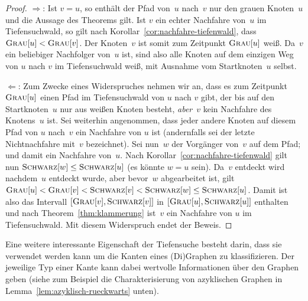 \begin{proof}
\glqq $\Longrightarrow$\grqq: Ist $v=u$, so enthält der Pfad von~$u$ nach~$v$ nur den grauen Knoten~$u$ und die Aussage des Theorems gilt.
Ist $v$ ein echter Nachfahre von~$u$ im Tiefensuchwald, so gilt nach Korollar~\ref{cor:nachfahre-tiefenwald}, dass $\mathop{\text{\textsc{Grau}}}[u] < \mathop{\text{\textsc{Grau}}}[v]$.
Der Knoten~$v$ ist somit zum Zeitpunkt $\mathop{\text{\textsc{Grau}}}[u]$ weiß.
Da~$v$ ein beliebiger Nachfolger von~$u$ ist, sind also alle Knoten auf dem einzigen Weg von $u$ nach $v$ im Tiefensuchwald weiß, mit Ausnahme vom Startknoten~$u$ selbst.

\glqq $\Longleftarrow$\grqq: Zum Zwecke eines Widerspruches nehmen wir an, dass es zum Zeitpunkt $\mathop{\text{\textsc{Grau}}}[u]$ einen Pfad im Tiefensuchwald von $u$ nach $v$ gibt, der bis auf den Startknoten~$u$ nur aus weißen Knoten besteht, \emph{aber}~$v$ kein Nachfahre des Knotens~$u$ ist.
Sei weiterhin angenommen, dass jeder andere Knoten auf diesem Pfad von $u$ nach~$v$ ein Nachfahre von $u$ ist (andernfalls sei der letzte Nichtnachfahre mit~$v$ bezeichnet).
Sei nun~$w$ der Vorgänger von~$v$ auf dem Pfad; und damit ein Nachfahre von~$u$.
Nach Korollar~\ref{cor:nachfahre-tiefenwald} gilt nun $\mathop{\text{\textsc{Schwarz}}}[w] \leq \mathop{\text{\textsc{Schwarz}}}[u]$ (es könnte $w=u$ sein).
Da~$v$ entdeckt wird nachdem~$u$ entdeckt wurde, aber bevor~$w$ abgearbeitet ist, gilt $\mathop{\text{\textsc{Grau}}}[u] < \mathop{\text{\textsc{Grau}}}[v] < \mathop{\text{\textsc{Schwarz}}}[v] < \mathop{\text{\textsc{Schwarz}}}[w] \leq \mathop{\text{\textsc{Schwarz}}}[u]$.
Damit ist also das Intervall $\left[\mathop{\text{\textsc{Grau}}}[v],\mathop{\text{\textsc{Schwarz}}}[v]\right]$ in $[\mathop{\text{\textsc{Grau}}}[u],\mathop{\text{\textsc{Schwarz}}}[u]]$ enthalten und nach Theorem~\ref{thm:klammerung} ist~$v$ ein Nachfahre von $u$ im Tiefensuchwald.
Mit diesem Widerspruch endet der Beweis.
\end{proof}


\begin{bem} 
Eine weitere interessante Eigenschaft der Tiefensuche besteht darin, dass sie verwendet werden kann um die Kanten eines (Di)Graphen zu klassifizieren.
Der jeweilige Typ einer Kante kann dabei wertvolle Informationen über den Graphen geben (siehe zum Beispiel die Charakterisierung von azyklischen Graphen in Lemma~\ref{lem:azyklisch-rueckwarts} unten).
\end{bem} 

